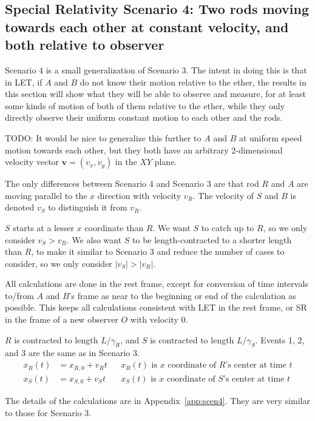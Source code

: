 \documentclass[a4paper]{article}
\theoremstyle{plain}
\theoremstyle{definition}
\newcommand{\vect}[1]{\mathbf{#1}}
\begin{document}
\subsection{Special Relativity Scenario 4: Two rods moving towards each other at constant velocity, and both relative to observer}
\label{sec:scen4}

Scenario 4 is a small generalization of Scenario 3.  The intent in
doing this is that in LET, if $A$ and $B$ do not know their motion
relative to the ether, the results in this section will show what they
will be able to observe and measure, for at least some kinds of motion
of both of them relative to the ether, while they only directly
observe their uniform constant motion to each other and the rods.

TODO: It would be nice to generalize this further to $A$ and $B$ at
uniform speed motion towards each other, but they both have an
arbitrary 2-dimensional velocity vector $\vect v = (v_x, v_y)$ in the
$XY$ plane.

The only differences between Scenario 4 and Scenario 3 are that rod
$R$ and $A$ are moving parallel to the $x$ direction with velocity
$v_R$.  The velocity of $S$ and $B$ is denoted $v_S$ to distinguish it
from $v_R$.

$S$ starts at a lesser $x$ coordinate than $R$.  We want $S$ to catch
up to $R$, so we only consider $v_S > v_R$.  We also want $S$ to be
length-contracted to a shorter length than $R$, to make it similar to
Scenario 3 and reduce the number of cases to consider, so we only
consider $|v_S| > |v_R|$.

All calculations are done in the rest frame, except for conversion of
time intervals to/from $A$ and $B$'s frame as near to the beginning or
end of the calculation as possible.  This keeps all calculations
consistent with LET in the rest frame, or SR in the frame of a new
observer $O$ with velocity 0.

$R$ is contracted to length $L/\gamma_{R}$,
and $S$ is contracted to length $L/\gamma_{S}$.
Events 1, 2, and 3 are the same as in Scenario 3.
\begin{align}
x_R(t) & = x_{R,0} + v_R t & & \text{$x_R(t)$ is $x$ coordinate of $R$'s center at time $t$} \\
x_S(t) & = x_{S,0} + v_S t & & \text{$x_S(t)$ is $x$ coordinate of $S$'s center at time $t$}
\end{align}

The details of the calculations are in Appendix~\ref{app:scen4}.
They are very similar to those for Scenario 3.
\end{document}
